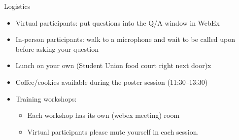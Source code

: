 \documentclass[aspectratio=169, 12pt]{beamer}
\begin{document}
\begin{frame}{Logistics}
  \begin{itemize}
  \item Virtual participants: put questions into the Q/A window in WebEx
  \item In-person participants: walk to a microphone and wait to be called upon
    before asking your question
  \item Lunch on your own (Student Union food court right next door)x
  \item Coffee/cookies available during the poster session (11:30--13:30)
  \item Training workshops:
    \begin{itemize}
    \item Each workshop has its own (webex meeting) room
    \item Virtual participants please mute yourself in each session.
    \end{itemize}
  \end{itemize}
\end{frame}
\end{document}
